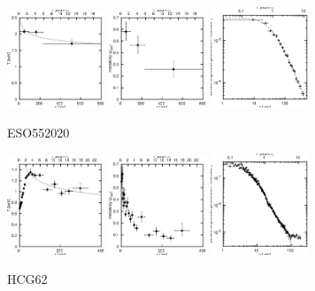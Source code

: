 \documentclass[structabstract]{aa}
\begin{document}
\begin{figure}[h]
   \centering
   \includegraphics[width=0.26\textwidth]{tprofile_eso55.eps}
   \includegraphics[width=0.26\textwidth]{zprofile_eso55.eps}
   \includegraphics[width=0.26\textwidth]{sbps_eso55.eps}
   \caption{ESO552020}
   \label{fig:tprofeso55}%
\end{figure}
\clearpage
\begin{figure}[h]
   \centering
   \includegraphics[width=0.26\textwidth]{tprofile_hcg62.eps}
   \includegraphics[width=0.26\textwidth]{zprofile_hcg62.eps}
   \includegraphics[width=0.26\textwidth]{sbps_hcg62.eps}
   \caption{HCG62}
   \label{fig:tprofhcg62}%
\end{figure}
\end{document}
